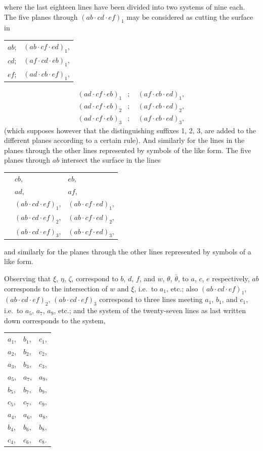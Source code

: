 \documentclass[11pt,a4paper]{book}
\begin{document}
where the last eighteen lines have been divided into two systems of nine each. The five planes through $(ab \cdot cd \cdot ef)_1$ may be considered as cutting the surface in
\begin{center}
\begin{tabular}{ll}
$ab$; & $(ab \cdot cf \cdot ed)_1$, \\
$cd$; & $(af \cdot cd \cdot eb)_1$, \\
$ef$; & $(ad \cdot cb \cdot ef)_1$,
\end{tabular}
\end{center}
\begin{align*}
(ad \cdot cf \cdot eb)_1 &;\quad (af \cdot cb \cdot ed)_1, \\
(ad \cdot cf \cdot eb)_2 &;\quad (af \cdot cb \cdot ed)_2, \\
(ad \cdot cf \cdot eb)_3 &;\quad (af \cdot cb \cdot ed)_3,
\end{align*}
(which supposes however that the distinguishing suffixes 1, 2, 3, are added to the different planes according to a certain rule). And similarly for the lines in the planes through the other lines represented by symbols of the like form. The five planes through $ab$ intersect the surface in the lines
\begin{center}
\begin{tabular}{lll}
& $cb$, & $eb$, \\
& $ad$, & $af$, \\
& $(ab \cdot cd \cdot ef)_1$, & $(ab \cdot cf \cdot ed)_1$, \\
& $(ab \cdot cd \cdot ef)_2$, & $(ab \cdot cf \cdot ed)_2$, \\
& $(ab \cdot cd \cdot ef)_3$, & $(ab \cdot cf \cdot ed)_3$,
\end{tabular}
\end{center}
and similarly for the planes through the other lines represented by symbols of a like form.

Observing that $\xi$, $\eta$, $\zeta$, correspond to $b$, $d$, $f$, and $w$, $\theta$, $\bar{\theta}$, to $a$, $c$, $e$ respectively, $ab$ corresponds to the intersection of $w$ and $\xi$, i.e.\ to $a_1$, etc.; also $(ab \cdot cd \cdot ef)_1$, $(ab \cdot cd \cdot ef)_2$, $(ab \cdot cd \cdot ef)_3$ correspond to three lines meeting $a_1$, $b_1$, and $c_1$, i.e.\ to $a_5$, $a_7$, $a_9$, etc.; and the system of the twenty-seven lines as last written down corresponds to the system,
\begin{center}
\begin{tabular}{lll}
$a_1$, & $b_1$, & $c_1$, \\
$a_2$, & $b_2$, & $c_2$, \\
$a_3$, & $b_3$, & $c_3$, \\[6pt]
$a_5$, & $a_7$, & $a_9$, \\
$b_5$, & $b_7$, & $b_9$, \\
$c_5$, & $c_7$, & $c_9$, \\[6pt]
$a_4$, & $a_6$, & $a_8$, \\
$b_4$, & $b_6$, & $b_8$, \\
$c_4$, & $c_6$, & $c_8$.
\end{tabular}
\end{center}
\end{document}
